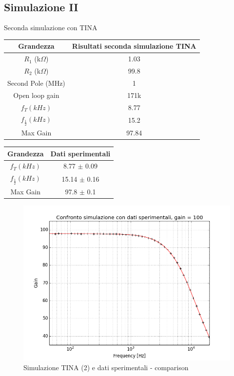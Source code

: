 \documentclass{beamer}
\begin{document}
\subsection{Simulazione II}

\begin{frame}{Seconda simulazione con TINA}

{
\centering
\begin{tabular}{|c|c|}
\hline 
Grandezza & Risultati seconda simulazione TINA\\ 
\hline 
$R_1$ (k$\Omega$)& 1.03  \\ 
\hline 
$R_2$ (k$\Omega$) & 99.8 \\ 
\hline 
Second Pole (MHz) & 1 \\ 
\hline
Open loop gain & 171k\\
\hline 
$f_T (kHz)$ & 8.77 \\ 
\hline 
$f_{\frac{1}{2}} (kHz)$ & 15.2 \\ 
\hline 
Max Gain & 97.84 \\ 
\hline 

\end{tabular}


\begin{tabular}{|c|c|}
\hline 
Grandezza & Dati sperimentali \\ 
\hline 
$f_T (kHz)$ & 8.77 $\pm$ 0.09 \\ 
\hline 
$f_{\frac{1}{2}} (kHz)$ & 15.14 $\pm$ 0.16 \\ 
\hline 
Max Gain & 97.8 $\pm$ 0.1 \\ 
\hline 
\end{tabular} 
 
}
\end{frame}

\begin{frame}
\begin{figure}
\centering
\includegraphics[width=0.9\linewidth]{./es8comparisons}
\caption{Simulazione TINA (2) e dati sperimentali - comparison}
\label{fig:es8comparisons}
\end{figure}

\end{frame}
\end{document}
